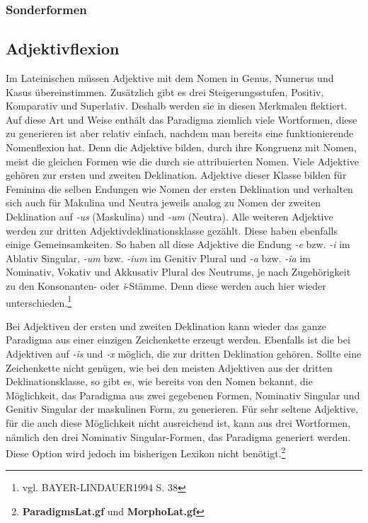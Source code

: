\documentclass[12pt,abstract=on]{scrreprt}
\begin{document}
\subsubsection{Sonderformen}
\subsection{Adjektivflexion}
Im Lateinischen müssen Adjektive mit dem Nomen in Genus, Numerus und Kasus übereinstimmen. Zusätzlich gibt es drei Steigerungsstufen, Positiv, Komparativ und Superlativ. Deshalb werden sie in diesen Merkmalen flektiert. Auf diese Art und Weise enthält das Paradigma ziemlich viele Wortformen, diese zu generieren ist aber relativ einfach, nachdem man bereits eine funktionierende Nomenflexion hat. Denn die Adjektive bilden, durch ihre Kongruenz mit Nomen, meist die gleichen Formen wie die durch sie attribuierten Nomen. Viele Adjektive gehören zur ersten und zweiten Deklination. Adjektive dieser Klasse bilden für Feminina die selben Endungen wie Nomen der ersten Deklination und verhalten sich auch für Makulina und Neutra jeweils analog zu Nomen der zweiten Deklination auf \textit{-us} (Maskulina) und \textit{-um} (Neutra). Alle weiteren Adjektive werden zur dritten Adjektivdeklinationsklasse gezählt. Diese haben ebenfalls einige Gemeinsamkeiten. So haben all diese Adjektive die Endung \textit{-e} bzw. \textit{-i} im Ablativ Singular, \textit{-um} bzw. \textit{-ium} im Genitiv Plural und \textit{-a} bzw. \textit{-ia} im Nominativ, Vokativ und Akkusativ Plural des Neutrums, je nach Zugehörigkeit zu den Konsonanten- oder \textit{ǐ}-Stämme. Denn diese werden auch hier wieder unterschieden.\footnote{vgl. BAYER-LINDAUER1994 S. 38} \par
Bei Adjektiven der ersten und zweiten Deklination kann wieder das ganze Paradigma aus einer einzigen Zeichenkette erzeugt werden. Ebenfalls ist die bei Adjektiven auf \textit{-is} und \textit{-x} möglich, die zur dritten Deklination gehören. Sollte eine Zeichenkette nicht genügen, wie bei den meisten Adjektiven aus der dritten Deklinationsklasse, so gibt es, wie bereits von den Nomen bekannt, die Möglichkeit, das Paradigma aus zwei gegebenen Formen, Nominativ Singular und Genitiv Singular der maskulinen Form, zu generieren. Für sehr seltene Adjektive, für die auch diese Möglichkeit nicht ausreichend ist, kann aus drei Wortformen, nämlich den drei Nominativ Singular-Formen, das Paradigma generiert werden. Diese Option wird jedoch im bisherigen Lexikon nicht benötigt.\footnote{\textbf{ParadigmsLat.gf} und \textbf{MorphoLat.gf}} \par
\end{document}
